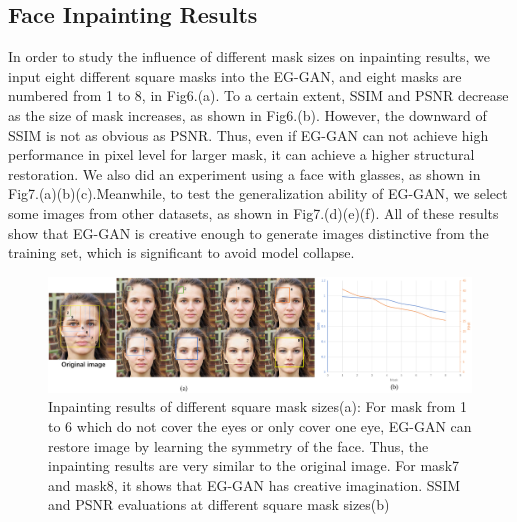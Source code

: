 \documentclass[journal]{IEEEtran}
\begin{document}
    \subsection{Face Inpainting Results}
    In order to study the influence of different mask sizes on inpainting results, we input eight different square masks into the EG-GAN, and eight masks are numbered from 1 to 8, in Fig6.(a). To a certain extent, SSIM and PSNR decrease as the size of mask increases, as shown in Fig6.(b). However, the downward of SSIM is not as obvious as PSNR. Thus, even if EG-GAN can not achieve high performance in pixel level for larger mask, it can achieve a higher structural restoration. We also did an experiment using a face with glasses, as shown in Fig7.(a)(b)(c).Meanwhile, to test the generalization ability of EG-GAN, we select some images from other datasets, as shown in Fig7.(d)(e)(f). All of these results show that EG-GAN is creative enough to generate images distinctive from the training set, which is significant to avoid model collapse.
    \begin{figure}[H]
       \centering
       \includegraphics[width=0.9\linewidth]{figures/Fig6.png}
       \caption{Inpainting results of different square mask sizes(a): For mask from 1 to 6 which do not cover the eyes or only cover one eye, EG-GAN can restore image by learning the symmetry of the face. Thus, the inpainting results are very similar to the original image. For mask7 and mask8, it shows that EG-GAN has creative imagination. SSIM and PSNR evaluations at different square mask sizes(b)}
       \label{fig:Fig6}
    \end{figure}
\end{document}
